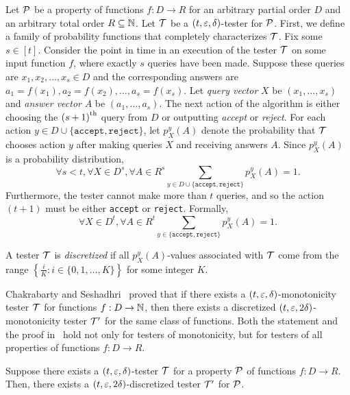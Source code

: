 Let $\mathcal{P}$ be a property of functions $f:D \to R$ for an arbitrary partial order $D$ and an arbitrary total order $R \subseteq \mathbb N$. Let ${\cal T}$ be a $(t,\varepsilon,\delta)$-tester for $\mathcal{P}$. First, we define a family of probability functions that completely characterizes ${\cal T}$. Fix some $s \in [t]$. Consider the point in time in an execution of the tester ${\cal T}$ on some input function $f$, where exactly $s$ queries have been made. 
Suppose these queries are $x_1, x_2, \ldots, x_s \in D$ and the corresponding answers are $a_1=f(x_1), a_2=f(x_2), \ldots, a_s=f(x_s)$. 
Let {\em query vector} $X$ be $(x_1, \ldots, x_s)$ and {\em answer vector} $A$ be $(a_1, \ldots, a_s)$. The next action of the algorithm is either choosing the ${(s+1)}^{\mathrm{th}}$ query from $D$ or outputting {\em accept} or {\em reject}. For each action $y \in D \cup \{\texttt{accept}, \texttt{reject}\}$, let $p_X^y(A)$ denote the probability that ${\cal T}$ chooses action $y$ after making queries $X$ and receiving answers $A$. Since $p_X^y(A)$ is a probability distribution,
$$\forall s < t, \forall X \in D^s, \forall A \in R^s \sum_{y \in D \cup \{\texttt{accept}, \texttt{reject} \}} p_X^y(A) = 1.$$
Furthermore, the tester cannot make more than $t$ queries,
and so the action $(t+1)$ must be either \texttt{accept} or \texttt{reject}. Formally,
$$\forall X \in D^t, \forall A \in R^t \sum_{y \in \{\texttt{accept}, \texttt{reject} \}} p_X^y(A) = 1.$$

\begin{definition}  \label{def:disc}
A tester ${\cal T}$ is {\em discretized} if all $p_X^y(A)$-values associated with ${\cal T}$ come from the range $\left\{ \frac{i}{K}: i\in \{0,1,\ldots,K\} \right\}$ for some integer $K$.
\end{definition}

Chakrabarty and Seshadhri~\cite{CS14} proved that if there exists a $(t,\varepsilon,\delta)$-monotonicity tester ${\cal T}$ for functions $f:D \to \mathbb N$, then there exists a discretized $(t,\varepsilon,2\delta)$-monotonicity tester ${\cal T}'$ for the same class of functions.
Both the statement and the proof in~\cite{CS14} hold not only for testers of monotonicity, but for testers of all properties of functions $f:D \to R$.

\begin{lemma} \label{lem:disc-test}
Suppose there exists a $(t,\varepsilon,\delta)$-tester ${\cal T}$ for a property $\mathcal{P}$ of functions $f:D \to R$.
Then, there exists a $(t,\varepsilon,2\delta)$-discretized tester ${\cal T}'$ for $\mathcal{P}$.
\end{lemma}

